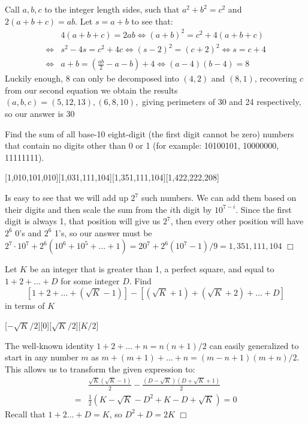 \begin{solution}[30]
    Call $a,b,c$ to the integer length sides, such that $a^2+b^2=c^2$ and $2(a+b+c)=ab$. Let $s=a+b$ to see that:
    \begin{align*}
        & 4(a+b+c) = 2ab \iff (a+b)^2 = c^2 + 4(a+b+c) \\
        \iff& s^2 -4s= c^2+4c \iff (s-2)^2 = (c+2)^2 \iff s=c+4 \\
        \iff& a+b = \left( \frac{ab}{2} -a - b\right) + 4 \iff (a-4)(b-4) = 8
    \end{align*}
    Luckily enough, $8$ can only be decomposed into $(4,2)$ and $(8,1)$, recovering $c$ from our second equation we obtain the results $(a,b,c) =  (5,12,13),(6,8,10),$ giving perimeters of 30 and 24 respectively, so our answer is 30
\end{solution}

\begin{problem}[A][5][Fall 2019 P8]
    Find the sum of all base-10 eight-digit (the first digit cannot be zero) numbers that contain no digits other than 0 or 1 (for example: 10100101, 10000000, 11111111).
\end{problem}
[1,010,101,010][1,031,111,104][1,351,111,104][1,422,222,208]

\begin{solution}[D]
    Is easy to see that we will add up $2^7$ such numbers. We can add them based on their digits and then scale the sum from the $i$th digit by $10^{7-i}$. Since the first digit is always 1, that position will give us $2^7$, then every other position will have $2^6$ 0's and $2^6$ 1's, so our answer must be $2^7 \cdot 10^7 + 2^6 ( 10^6+10^5 + \ldots + 1) = 20^7 + 2^6(10^7-1)/9 = 1,351,111,104$ $\Box$ 
\end{solution}
\begin{problem}[A][4][Spring 2020 P6]
    Let $K$ be an integer that is greater than 1, a perfect square, and equal to $1+2+\ldots+D$ for some integer $D$. Find 
    $$\left[ 1+2+\ldots+ (\sqrt{K} - 1)\right ] - \left[ (\sqrt{K}+1) + (\sqrt{K} + 2) + \ldots + D\right]$$
    in terms of $K$
\end{problem}
[$-\sqrt{K} / 2$][0][$\sqrt{K} / 2$][$K / 2$]

\begin{solution}[C]
    The well-known identity $1 + 2 + \ldots + n = n(n+1)/2$ can easily generalized to start in any number $m$ as $m + (m+1 ) + \ldots + n = (m-n+1)(m+n)/2$. This allows us to transform the given expression to:
    \begin{align*}
        &\frac{\sqrt{K} \left( \sqrt{K} - 1\right)}{2} - \frac{\left( D - \sqrt{K} \right) \left( D + \sqrt{K} + 1 \right) }{2} \\
        =& \frac{1}{2} \left( K - \sqrt{K} - D^2 + K - D + \sqrt{K}\right) = \boxed{0}
    \end{align*}
    Recall that $1+2 \ldots + D = K$, so $D^2 + D = 2K$ $\Box$
\end{solution}


